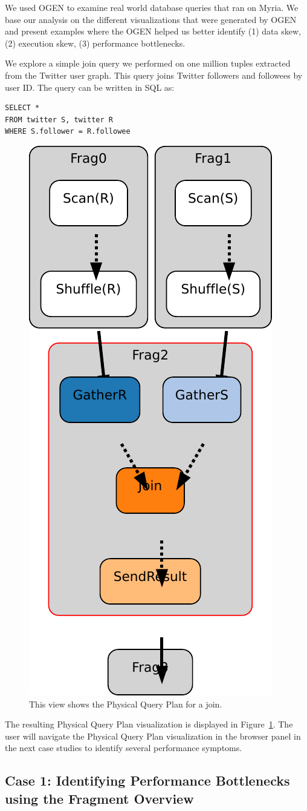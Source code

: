 \documentclass{chi2009}
\newcommand*{\system}{OGEN\xspace}
\newcommand*{\graph}{Physical Query Plan\xspace}
\newcommand*{\overall}{Fragment Overview\xspace}
\begin{document}
We used \system to examine real world database queries that ran on Myria. We base our analysis on the different visualizations that were generated by \system and present examples where the \system helped us better identify (1) data skew, (2) execution skew, (3) performance bottlenecks.

We explore a simple join query we performed on one million tuples extracted from the Twitter user graph. This query joins Twitter followers and followees by user ID. The query can be written in SQL as:

\begin{lstlisting}
SELECT *
FROM twitter S, twitter R
WHERE S.follower = R.followee
\end{lstlisting}


\begin{figure}[ht]
  \centering
  \includegraphics[width=0.4\columnwidth]{images/graph_join}
  \caption{This view shows the \graph for a join.}
  \label{fig:join}
\end{figure}


The resulting \graph visualization is displayed in Figure~\ref{fig:join}. The user will navigate the \graph visualization in the browser panel in the next case studies to identify several performance symptoms.




\subsection{Case 1: Identifying Performance Bottlenecks using the \overall}
\end{document}

